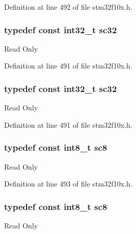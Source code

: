 Definition at line 492 of file stm32f10x.\+h.

\subsubsection[{\texorpdfstring{sc32}{sc32}}]{\setlength{\rightskip}{0pt plus 5cm}typedef const {\bf int32\+\_\+t} {\bf sc32}}\hypertarget{group___exported__types_gad97679599f3791409523fdb1c6156a28}{}\label{group___exported__types_gad97679599f3791409523fdb1c6156a28}
Read Only 

Definition at line 491 of file stm32f10x.\+h.

\subsubsection[{\texorpdfstring{sc32}{sc32}}]{\setlength{\rightskip}{0pt plus 5cm}typedef const {\bf int32\+\_\+t} {\bf sc32}}\hypertarget{group___exported__types_gad97679599f3791409523fdb1c6156a28}{}\label{group___exported__types_gad97679599f3791409523fdb1c6156a28}
Read Only 

Definition at line 491 of file stm32f10x.\+h.

\subsubsection[{\texorpdfstring{sc8}{sc8}}]{\setlength{\rightskip}{0pt plus 5cm}typedef const {\bf int8\+\_\+t} {\bf sc8}}\hypertarget{group___exported__types_ga30e6c0f6718e1b6d26dc9d94ddcf9d11}{}\label{group___exported__types_ga30e6c0f6718e1b6d26dc9d94ddcf9d11}
Read Only 

Definition at line 493 of file stm32f10x.\+h.

\subsubsection[{\texorpdfstring{sc8}{sc8}}]{\setlength{\rightskip}{0pt plus 5cm}typedef const {\bf int8\+\_\+t} {\bf sc8}}\hypertarget{group___exported__types_ga30e6c0f6718e1b6d26dc9d94ddcf9d11}{}\label{group___exported__types_ga30e6c0f6718e1b6d26dc9d94ddcf9d11}
Read Only 

